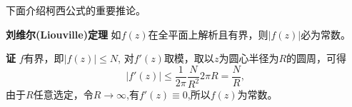 下面介绍柯西公式的重要推论。



\textbf{刘维尔(Liouville)定理} \quad 如$f(z)$在全平面上解析且有界，则$|f(z)|$必为常数。

\textbf{证} \quad $f$有界，即$|f(z)| \leq N$, 对$f'(z)$取模，取以$z$为圆心半径为$R$的圆周，可得
\[
  |f'(z)| \leq \frac{1}{2\pi} \frac{N} {R^2} 2\pi R = \frac{N}{R},
\]
由于$R$任意选定，令$R\to \infty$,有$f'(z) \equiv 0$,所以$f(z)$为常数。